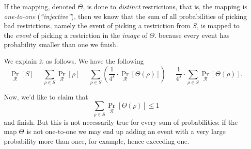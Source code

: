 If the mapping, denoted \( \Theta \), is done to \emph{distinct} restrictions, that is, the mapping is 
\emph{one-to-one} (\emph{``injective''}), then we know that the sum of all probabilities of picking bad restrictions, 
namely the event of picking a restriction from \( S \), is mapped to the \emph{event} of picking a restriction in the 
\emph{image} of \( \Theta \).
because every event has probability smaller than one we finish. 

We explain it as follows. We have the following 
\[
\Pr_{\mathcal{R}}[S] = \sum_{\rho \in S} \Pr_{\mathcal{R}}[\rho] = 
\sum_{\rho \in S} \left(\frac{1}{4^s} \cdot \Pr_{\mathcal{R}}[\Theta(\rho)]\right) =
\frac{1}{4^s} \cdot \sum_{\rho \in S} \Pr_{\mathcal{R}}[\Theta(\rho)].
\]

Now, we'd like to claim that 
\[
\sum_{\rho \in S} \Pr_{\mathcal{R}}[\Theta(\rho)] \leq 1
\]
and finish. But this is not necessarily true for every sum of probabilities: if the map \( \Theta \) is 
not one-to-one we may end up adding an event with a very large probability more than once, for example, 
hence exceeding one.  





